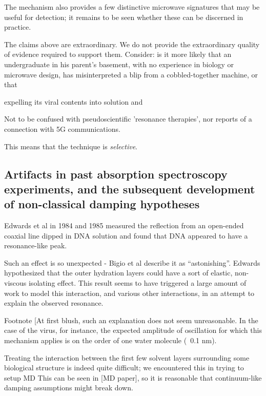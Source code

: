 \documentclass[paper.tex]{subfiles}
\begin{document}
The mechanism also provides a few distinctive microwave signatures that may be useful for detection; it remains to be seen whether these can be discerned in practice.

The claims above are extraordinary. We do not provide the extraordinary quality of evidence required to support them. Consider: is it more likely that an undergraduate in his parent's basement, with no experience in biology or microwave design, has misinterpreted a blip from a cobbled-together machine, or that 

expelling its viral contents into solution and 

Not to be confused with pseudoscientific 'resonance therapies', nor reports of a connection with 5G communications.

This means that the technique is {\it selective}.



















\subsection{Artifacts in past absorption spectroscopy experiments, and the subsequent development of non-classical damping hypotheses}

Edwards et al in 1984 and 1985 measured the reflection from an open-ended coaxial line dipped in DNA solution and found that DNA appeared to have a resonance-like peak.

Such an effect is so unexpected - Bigio et al describe it as “astonishing”. Edwards hypothesized that the outer hydration layers could have a sort of elastic, non-viscous isolating effect. This result seems to have triggered a large amount of work to model this interaction, and various other interactions, in an attempt to explain the observed resonance.

Footnote [At first blush, such an explanation does not seem unreasonable. In the case of the virus, for instance, the expected amplitude of oscillation for which this mechanism applies is on the order of one water molecule (~0.1 nm).

Treating the interaction between the first few solvent layers surrounding some biological structure is indeed quite difficult; we encountered this in trying to setup MD This can be seen in [MD paper], so it is reasonable that continuum-like damping assumptions might break down. 
\end{document}
